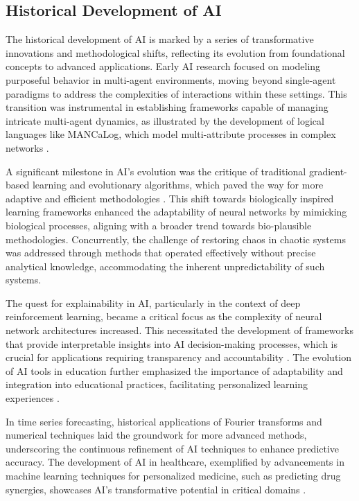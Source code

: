 \subsection{Historical Development of AI} \label{subsec:Historical Development of AI}



The historical development of AI is marked by a series of transformative innovations and methodological shifts, reflecting its evolution from foundational concepts to advanced applications. Early AI research focused on modeling purposeful behavior in multi-agent environments, moving beyond single-agent paradigms to address the complexities of interactions within these settings. This transition was instrumental in establishing frameworks capable of managing intricate multi-agent dynamics, as illustrated by the development of logical languages like MANCaLog, which model multi-attribute processes in complex networks \cite{shakarian2022reasoningcomplexnetworkslogic}.



A significant milestone in AI's evolution was the critique of traditional gradient-based learning and evolutionary algorithms, which paved the way for more adaptive and efficient methodologies \cite{le2019evolvingselfsupervisedneuralnetworks}. This shift towards biologically inspired learning frameworks enhanced the adaptability of neural networks by mimicking biological processes, aligning with a broader trend towards bio-plausible methodologies. Concurrently, the challenge of restoring chaos in chaotic systems was addressed through methods that operated effectively without precise analytical knowledge, accommodating the inherent unpredictability of such systems.



The quest for explainability in AI, particularly in the context of deep reinforcement learning, became a critical focus as the complexity of neural network architectures increased. This necessitated the development of frameworks that provide interpretable insights into AI decision-making processes, which is crucial for applications requiring transparency and accountability \cite{huang2022physicallyexplainablecnnsar}. The evolution of AI tools in education further emphasized the importance of adaptability and integration into educational practices, facilitating personalized learning experiences \cite{pandy2024advancementsroboticsprocessautomation}.



In time series forecasting, historical applications of Fourier transforms and numerical techniques laid the groundwork for more advanced methods, underscoring the continuous refinement of AI techniques to enhance predictive accuracy. The development of AI in healthcare, exemplified by advancements in machine learning techniques for personalized medicine, such as predicting drug synergies, showcases AI's transformative potential in critical domains \cite{zolfaghari2023surveyautomateddetectionclassification}.



